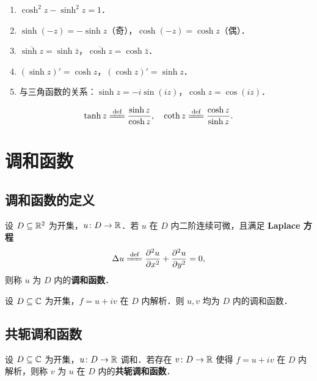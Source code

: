 \documentclass[12pt, a4paper, oneside, UTF8]{ctexbook}
\begin{document}
\begin{theorem}[双曲函数的性质]
\begin{enumerate}
    \item $\cosh^2 z - \sinh^2 z = 1$．
    \item $\sinh(-z)=-\sinh z$（奇），$\cosh(-z)=\cosh z$（偶）．
    \item $\overline{\sinh z}=\sinh\bar z$，$\overline{\cosh z}=\cosh\bar z$．
    \item $(\sinh z)' = \cosh z$，$(\cosh z)' = \sinh z$．
    \item 与三角函数的关系：$\sinh z = -i\sin(iz)$，$\cosh z = \cos(iz)$．
\end{enumerate}
\end{theorem}

\begin{definition}[双曲正切与余切]
\[
\tanh z \defeq \frac{\sinh z}{\cosh z},\quad \coth z \defeq \frac{\cosh z}{\sinh z}.
\]
\end{definition}

\section{调和函数}
\subsection{调和函数的定义}
\begin{definition}[调和函数]
设 $D\subseteq\mathbb{R}^2$ 为开集，$u\colon D\to\mathbb{R}$．若 $u$ 在 $D$ 内二阶连续可微，且满足 \textbf{Laplace 方程}
\[
\Delta u \defeq \frac{\partial^2 u}{\partial x^2} + \frac{\partial^2 u}{\partial y^2} = 0,
\]
则称 $u$ 为 $D$ 内的\textbf{调和函数}．
\end{definition}

\begin{theorem}[解析函数的实部与虚部皆调和]
设 $D\subseteq\mathbb{C}$ 为开集，$f=u+iv$ 在 $D$ 内解析．则 $u,v$ 均为 $D$ 内的调和函数．
\end{theorem}

\subsection{共轭调和函数}
\begin{definition}[共轭调和函数]
设 $D\subseteq\mathbb{C}$ 为开集，$u\colon D\to\mathbb{R}$ 调和．若存在 $v\colon D\to\mathbb{R}$ 使得 $f=u+iv$ 在 $D$ 内解析，则称 $v$ 为 $u$ 在 $D$ 内的\textbf{共轭调和函数}．
\end{definition}
\end{document}
